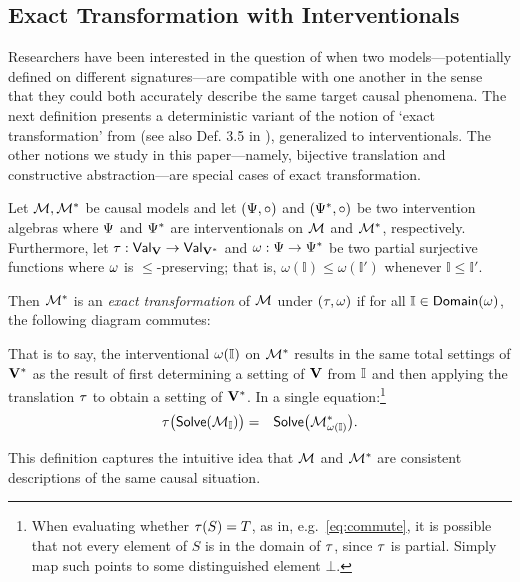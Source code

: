 \documentclass[twoside,11pt]{article}
\begin{document}
    





\subsection{Exact Transformation with Interventionals}
Researchers have been interested in the question of when two models---potentially defined on different signatures---are compatible with one another in the sense that they could both accurately describe the same target causal phenomena. The next definition presents a deterministic variant of the notion of `exact transformation' from \cite{Rubinstein2017} (see also Def. 3.5 in \citealt{BackersHalpern2019}), generalized to interventionals. The other notions we study in this paper---namely, bijective translation and constructive abstraction---are special cases of exact transformation. 

\begin{definition}\label{def:exact}
Let $\mathcal{M}, \mathcal{M}^*$ be causal models and let $(\Psi, \circ)$ and $(\Psi^*, \circ)$ be two intervention algebras where $\Psi$ and $\Psi^*$ are interventionals on $\mathcal{M}$ and $\mathcal{M}^*$, respectively. Furthermore, let $\tau: \mathsf{Val}_{\mathbf{V}} \to \mathsf{Val}_{\mathbf{V}^*}$ and $\omega: \Psi \to \Psi^*$ be two partial surjective functions where $\omega$ is $\leq$-preserving; that is, $\omega(\mathbb{I}) \leq \omega(\mathbb{I}')$ whenever $\mathbb{I} \leq \mathbb{I}'$.

Then $\mathcal{M}^*$ is an \emph{exact transformation} of $\mathcal{M}$ under $(\tau, \omega)$ if for all $\mathbb{I} \in \mathsf{Domain}(\omega)$, the following diagram commutes:
\begin{center}
\end{center}
That is to say, the interventional $\omega(\mathbb{I})$ on $\mathcal{M}^*$ results in the same total settings of $\mathbf{V}^*$ as the result of first determining a setting of $\mathbf{V}$ from $\mathbb{I}$ and then applying the translation $\tau$ to obtain a setting of $\mathbf{V}^*$. In a single equation:\footnote{
When evaluating whether $\tau(S) = T$, as in, e.g.\ \eqref{eq:commute}, it is possible that not every element of $S$ is in the domain of $\tau$, since $\tau$ is partial.
Simply map such points to some distinguished element $\bot$.} 
\begin{eqnarray}\tau\big(\mathsf{Solve}(\mathcal{M}_{\mathbb{I}})\big)  & = & \mathsf{Solve}\big(\mathcal{M}^*_{\omega(\mathbb{I})}\big).\label{eq:commute}\end{eqnarray}
\label{eq:exacttrans}
\end{definition} This definition captures the intuitive idea that $\mathcal{M}$ and $\mathcal{M}^*$ are consistent descriptions of the same causal situation. 
\end{document}
